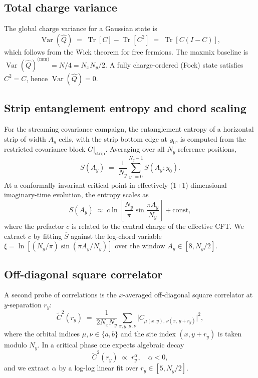 \documentclass[twocolumn,aps,prx,10pt,floatfix]{revtex4-2}
\begin{document}
\subsection{Total charge variance}

The global charge variance for a Gaussian state is
\begin{equation}
  \operatorname{Var}(\hat{Q}) \;=\;
  \operatorname{Tr}[C] - \operatorname{Tr}[C^2]
  \;=\; \operatorname{Tr}[C(I-C)],
  \label{eq:totalvar}
\end{equation}
which follows from the Wick theorem for free fermions.
The maxmix baseline is
$\operatorname{Var}(\hat{Q})^\text{(mm)} = N/4 = N_x N_y / 2$.
A fully charge-ordered (Fock) state satisfies $C^2 = C$, hence
$\operatorname{Var}(\hat{Q}) = 0$.

\subsection{Strip entanglement entropy and chord scaling}

For the streaming covariance campaign, the entanglement entropy of a horizontal
strip of width $A_y$ cells, with the strip bottom edge at $y_0$, is computed from
the restricted covariance block $G|_\text{strip}$.  Averaging over all $N_y$
reference positions,
\begin{equation}
  \overline{S}(A_y) \;=\; \frac{1}{N_y}\sum_{y_0=0}^{N_y-1} S(A_y; y_0).
  \label{eq:stripentropy}
\end{equation}
At a conformally invariant critical point in effectively (1+1)-dimensional
imaginary-time evolution, the entropy scales as~\cite{Calabrese2004}
\begin{equation}
  \overline{S}(A_y) \;\approx\; c \ln\!\left[
    \frac{N_y}{\pi}\sin\!\frac{\pi A_y}{N_y}\right] + \text{const},
  \label{eq:cftscaling}
\end{equation}
where the prefactor $c$ is related to the central charge of the effective CFT.
We extract $c$ by fitting $\overline{S}$ against the log-chord variable
$\xi = \ln\!\left[(N_y/\pi)\sin(\pi A_y/N_y)\right]$ over the window
$A_y \in [8, N_y/2]$.

\subsection{Off-diagonal square correlator}

A second probe of correlations is the $x$-averaged off-diagonal square
correlator at $y$-separation $r_y$:
\begin{equation}
  \widetilde{C}^2(r_y) \;=\;
  \frac{1}{2N_xN_y}
  \sum_{x,y,\mu,\nu}
  \bigl|C_{\mu(x,y),\,\nu(x,\,y+r_y)}\bigr|^2,
  \label{eq:correlator}
\end{equation}
where the orbital indices $\mu,\nu \in \{a,b\}$ and the site index
$(x,y+r_y)$ is taken modulo $N_y$.  In a critical phase one expects
algebraic decay
\begin{equation}
  \widetilde{C}^2(r_y) \;\propto\; r_y^{\alpha},\quad \alpha < 0,
  \label{eq:powerlaw}
\end{equation}
and we extract $\alpha$ by a log-log linear fit over
$r_y \in [5, N_y/2]$.
\end{document}
